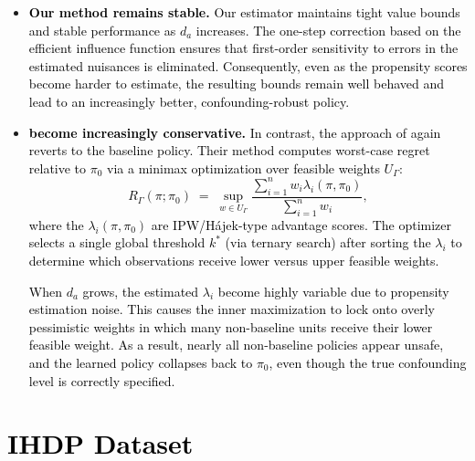 \documentclass{article} %
\theoremstyle{plain}
\theoremstyle{definition}
\theoremstyle{remark}
\newcommand{\rebuttal}[1]{\textcolor{black}{#1}}
\begin{document}
\begin{itemize}[leftmargin=1.5em]
    \item \rebuttal{\textbf{Our method remains stable.}
    Our estimator maintains tight value bounds and stable performance as $d_a$ increases. The one-step correction based on the efficient influence function ensures that first-order sensitivity to errors in the estimated nuisances is eliminated. Consequently, even as the propensity scores become harder to estimate, the resulting bounds remain well behaved and lead to an increasingly better, confounding-robust policy.}

    \item \rebuttal{\textbf{ \citet{Kallus.2018c,Kallus.2021d} become increasingly conservative.}
    In contrast, the approach of \citet{Kallus.2018c,Kallus.2021d} again reverts to the baseline policy. Their method computes worst-case regret relative to $\pi_0$ via a minimax optimization over feasible weights $U_\Gamma$:
    \[
    R_\Gamma(\pi;\pi_0)
    \;=\;
    \sup_{w \in U_\Gamma}
    \frac{\sum_{i=1}^n w_i \lambda_i(\pi,\pi_0)}{\sum_{i=1}^n w_i},
    \]
    where the $\lambda_i(\pi,\pi_0)$ are IPW/Hájek-type advantage scores.
    The optimizer selects a single global threshold $k^*$ (via ternary search) after sorting the $\lambda_i$ to determine which observations receive lower versus upper feasible weights.}

    \rebuttal{When $d_a$ grows, the estimated $\lambda_i$ become highly variable due to propensity estimation noise. This causes the inner maximization to lock onto overly pessimistic weights in which many non-baseline units receive their lower feasible weight. As a result, nearly all non-baseline policies appear unsafe, and the learned policy collapses back to $\pi_0$, even though the true confounding level is correctly specified.}

\end{itemize}


\clearpage


\section{\rebuttal{IHDP Dataset}}
\end{document}
